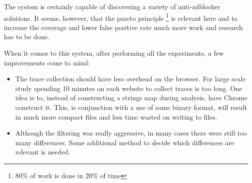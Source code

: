 The system is certainly capable of discovering a variety of anti-adblocker solutions.
It seems, however, that the pareto principle \footnote{80\% of work is done in 20\% of time}
is relevant here and to increase the coverage and lower false positive rate
much more work and research has to be done.

When it comes to this system, after performing all the experiments, a few improvements come to mind:
\begin{itemize}
  \item The trace collection should have less overhead on the browser. For large scale study
           spending 10 minutes on each website to collect traces is too long.
           One idea is to, instead of constructing a strings map during analysis, have
           Chrome construct it. This, is conjunction with a use of some binary format, will
           result in much more compact files and less time wasted on writing to files.
  \item Although the filtering was really aggressive, in many cases there were still too many differences.
           Some additional method to decide which differences are relevant is needed.
\end{itemize}

